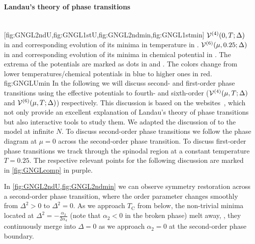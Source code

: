\paragraph{Landau’s theory of phase transitions}\label{paragraph:landauPTs}\mbox{}\\%
	[fig:GNGL2ndU,fig:GNGL1stU,fig:GNGL2ndmin,fig:GNGL1stmin]%
	{%
		$\VeffArgs[][(4)]{0,T;\Delta}$ in  and corresponding evolution of its minima in temperature in  .
		$\VeffArgs[][(6)]{\mu,0.25;\Delta}$ in  and corresponding evolution of its minima in chemical potential in  .
		The extrema of the potentials are marked as dots in  and .
		The colors change from lower temperatures/chemical potentials in blue to higher ones in red.
	}%
	{fig:GNGLUmin}%
In the following we will discuss second- and first-order phase transitions using the \gl{} effective potentials to fourth- and sixth-order ($\VeffArgs[][(4)]{\muT;\Delta}$ and $\VeffArgs[][(6)]{\muT;\Delta}$) respectively.
This discussion is based on the websites~\cite{Hadley:2022II,Hadley:2022I}, which not only provide an excellent explanation of Landau’s theory of phase transitions but also interactive tools to study them. 
We adapted the discussion of  to the \gn{} model at infinite $N$.
To discuss second-order phase transitions we follow the phase diagram at $\mu=0$ across the second-order phase transition.
To discuss first-order phase transitions we track through the spinodal region at a constant temperature $T=0.25$.
The respective relevant points for the following discussion are marked in \cref{fig:GNGLcomp} in purple.

In \cref{fig:GNGL2ndU,fig:GNGL2ndmin} we can observe symmetry restoration across a second-order phase transition, where the order parameter changes smoothly from $\Delta^2>0$ to $\Delta^2=0$.
As we approach $T_\mathrm{C}$ from below, the non-trivial minima located at $\Delta^2=-\frac{\alpha_2}{2\alpha_4}$ (note that $\alpha_2<0$ in the broken phase) melt away, \ie{}, they continuously merge into $\Delta=0$ as we approach $\alpha_2=0$ at the second-order phase boundary.

